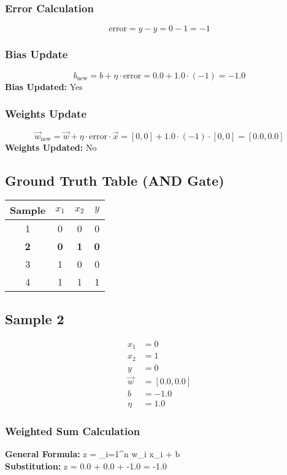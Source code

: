 \documentclass{article}
\begin{document}
\subsubsection*{Error Calculation}
\[
\text{error} = y - \hat{y} = 0 - 1 = -1
\]

\subsubsection*{Bias Update}
\[
b_{\text{new}} = b + \eta \cdot \text{error} = 0.0 + 1.0 \cdot (-1) = -1.0
\]
\textbf{Bias Updated:} Yes

\subsubsection*{Weights Update}
\[
\vec{w}_{\text{new}} = \vec{w} + \eta \cdot \text{error} \cdot \vec{x} = 
[0, 0] + 1.0 \cdot (-1) \cdot [0, 0] = 
[0.0, 0.0]
\]
\textbf{Weights Updated:} No

\subsection*{Ground Truth Table (AND Gate)}
\begin{center}
\begin{tabular}{|c|c|c|c|}
\hline
\textbf{Sample} & $x_1$ & $x_2$ & $y$ \\
\hline
1 & 0 & 0 & 0 \\
\hline
\rowcolor{yellow} \textbf{2} & \textbf{0} & \textbf{1} & \textbf{0} \\
\hline
3 & 1 & 0 & 0 \\
\hline
4 & 1 & 1 & 1 \\
\hline
\end{tabular}
\end{center}

\subsection*{Sample 2}
\begin{align*}
x_1 &= 0 \\
x_2 &= 1 \\
y &= 0 \\
\vec{w} &= [0.0, 0.0] \\
b &= -1.0 \\
\eta &= 1.0
\end{align*}

\subsubsection*{Weighted Sum Calculation}
\textbf{General Formula:} \quad
z = \sum_{i=1}^{n} w_i x_i + b
\\
\textbf{Substitution:} \quad
z = 0.0  + 0.0  + -1.0 = -1.0
\end{document}
